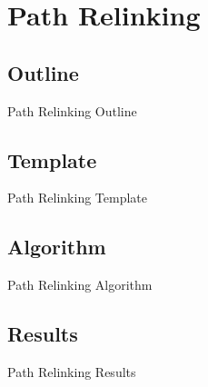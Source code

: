 \section{Path Relinking}

\subsection{Outline}
\begin{frame}[allowframebreaks]{Path Relinking Outline}{}
  
\end{frame}

\subsection{Template}
\begin{frame}[allowframebreaks]{Path Relinking Template}{}
  
\end{frame}

\subsection{Algorithm}
\begin{frame}[allowframebreaks]{Path Relinking Algorithm}{}
  \footnotesize{}
\end{frame}

\subsection{Results}
\begin{frame}[allowframebreaks]{Path Relinking Results}{}
  
\end{frame}
